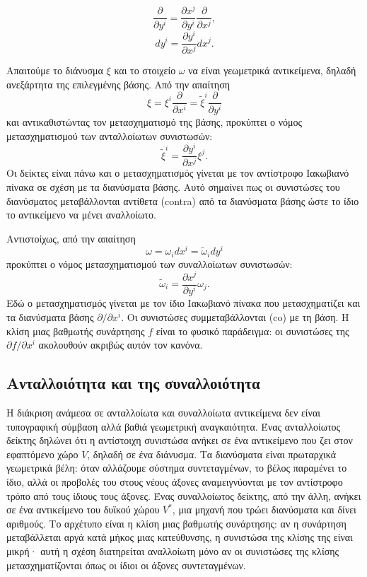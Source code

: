 \documentclass[12pt]{article}
\begin{document}
\[
\frac{\partial}{\partial y^i} = \frac{\partial x^j}{\partial y^i} \frac{\partial}{\partial x^j}, \tag{4}
\]
\[
dy^i = \frac{\partial y^i}{\partial x^j} dx^j. \tag{5}
\]

Απαιτούμε το διάνυσμα \( \xi \) και το στοιχείο \( \omega \) να είναι γεωμετρικά αντικείμενα, δηλαδή ανεξάρτητα της επιλεγμένης βάσης. Από την απαίτηση
\[
\xi = \xi^i \frac{\partial}{\partial x^i} = \tilde{\xi}^i \frac{\partial}{\partial y^i}
\]
και αντικαθιστώντας τον μετασχηματισμό της βάσης, προκύπτει ο νόμος μετασχηματισμού των ανταλλοίωτων συνιστωσών:
\[
\tilde{\xi}^i = \frac{\partial y^i}{\partial x^j} \xi^j. \tag{6}
\]
Οι δείκτες είναι πάνω και ο μετασχηματισμός γίνεται με τον αντίστροφο Ιακωβιανό πίνακα σε σχέση με τα διανύσματα βάσης. Αυτό σημαίνει πως οι συνιστώσες του διανύσματος μεταβάλλονται αντίθετα (contra) από τα διανύσματα βάσης ώστε το ίδιο το αντικείμενο να μένει αναλλοίωτο.

Αντιστοίχως, από την απαίτηση
\[
\omega = \omega_i dx^i = \tilde{\omega}_i dy^i
\]
προκύπτει ο νόμος μετασχηματισμού των συναλλοίωτων συνιστωσών:
\[
\tilde{\omega}_i = \frac{\partial x^j}{\partial y^i} \omega_j. \tag{7}
\]
Εδώ ο μετασχηματισμός γίνεται με τον ίδιο Ιακωβιανό πίνακα που μετασχηματίζει και τα διανύσματα βάσης \( \partial / \partial x^i \). Οι συνιστώσες συμμεταβάλλονται (co) με τη βάση. Η κλίση μιας βαθμωτής συνάρτησης \( f \) είναι το φυσικό παράδειγμα: οι συνιστώσες της \( \partial f / \partial x^i \) ακολουθούν ακριβώς αυτόν τον κανόνα.

\subsection{Ανταλλοιότητα και της συναλλοιότητα}

Η διάκριση ανάμεσα σε ανταλλοίωτα και συναλλοίωτα αντικείμενα δεν είναι τυπογραφική σύμβαση αλλά βαθιά γεωμετρική αναγκαιότητα. Ένας ανταλλοίωτος δείκτης δηλώνει ότι η αντίστοιχη συνιστώσα ανήκει σε ένα αντικείμενο που ζει στον εφαπτόμενο χώρο \( V \), δηλαδή σε ένα διάνυσμα. Τα διανύσματα είναι πρωταρχικά γεωμετρικά βέλη: όταν αλλάζουμε σύστημα συντεταγμένων, το βέλος παραμένει το ίδιο, αλλά οι προβολές του στους νέους άξονες αναμειγνύονται με τον αντίστροφο τρόπο από τους ίδιους τους άξονες. Ένας συναλλοίωτος δείκτης, από την άλλη, ανήκει σε ένα αντικείμενο του δυϊκού χώρου \( V^* \), μια μηχανή που τρώει διανύσματα και δίνει αριθμούς. Το αρχέτυπο είναι η κλίση μιας βαθμωτής συνάρτησης: αν η συνάρτηση μεταβάλλεται αργά κατά μήκος μιας κατεύθυνσης, η συνιστώσα της κλίσης της είναι μικρή· αυτή η σχέση διατηρείται αναλλοίωτη μόνο αν οι συνιστώσες της κλίσης μετασχηματίζονται όπως οι ίδιοι οι άξονες συντεταγμένων.
\end{document}
